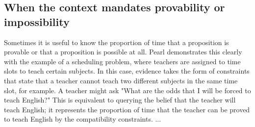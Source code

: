 \documentclass[letterpaper]{article}
\begin{document}
\subsection{When the context mandates provability or impossibility}
Sometimes it is useful to know the proportion of time that a proposition is provable or that a proposition is possible at all.  Pearl demonstrates this clearly with the example of a scheduling problem, where teachers are assigned to time slots to teach certain subjects. \cite{Pearl1988}  In this case, evidence takes the form of constraints that state that a teacher cannot teach two different subjects in the same time slot, for example.  A teacher might ask "What are the odds that I will be forced to teach English?"  This is equivalent to querying the belief that the teacher will teach English; it represents the proportion of time that the teacher can be proved to teach English by the compatibility constraints.
...




\end{document}
